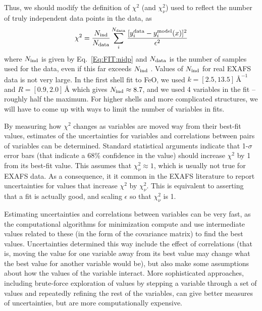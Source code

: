 Thus, we should  modify  the  definition of $\chi^2$ (and $\chi^2_{\nu}$)
used to reflect the number of truly independent data points in the data, as
\begin{equation}
  \chi^2  = \frac{N_{\rm ind}}{N_{\rm data}} \sum_i^{N_{\rm data}}
  \frac{[y_i^{\rm data} - y_i^{\rm  model}({x})]^2}{\epsilon^2}
  \label{Eq:FIT:chisquare_nidp}
\end{equation}
\noindent where $N_{\rm ind}$ is given by Eq.~\ref{Eq:FIT:nidp} and $N_{\rm
  data}$ is the number of samples used for the data, even if this far
exceeds $N_{\rm ind}$ .  Values of $N_{\rm ind}$ for real EXAFS data is not
very large.  In the first shell fit to FeO, we used $k=[2.5,
13.5]\,\text{\AA}^{-1}$ and $R=[0.9, 2.0]\,\text{\AA}$ which gives $N_{\rm ind}
\approx 8.7$, and we used 4 variables in the fit -- roughly half the
maximum.  For higher shells and more complicated structures, we will have
to come up with ways to limit the number of variables in fits.

By measuring how $\chi^2$ changes as variables are moved way from their
best-fit values, estimates of the uncertainties for variables and
correlations between pairs of variables can be determined.  Standard
statistical arguments indicate that 1-$\sigma$ error bars (that indicate a
68\% confidence in the value) should increase $\chi^2$ by 1 from its
best-fit value.  This assumes that $\chi^2_{\nu} \approx 1$, which is
usually not true for EXAFS data.  As a consequence, it it common in the
EXAFS literature to report uncertainties for values that increase $\chi^2$
by $\chi^2_{\nu}$.  This is equivalent to asserting that a fit is actually
good, and scaling $\epsilon$ so that $\chi^2_{\nu}$ is 1.

Estimating uncertainties and correlations between variables can be very
fast, as the computational algorithms for minimization compute and use
intermediate values related to these (in the form of the covariance matrix)
to find the best values. Uncertainties determined this way include the
effect of correlations (that is, moving the value for one variable away
from its best value may change what the best value for another variable
would be), but also make some assumptions about how the values of the
variable interact.  More sophisticated approaches, including brute-force
exploration of values by stepping a variable through a set of
values and repeatedly refining the rest of the variables, can give better
measures of uncertainties, but are more computationally expensive.

